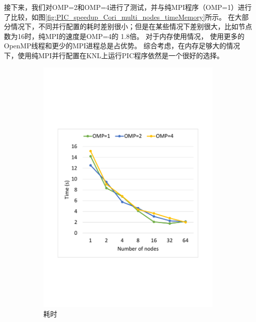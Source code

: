 接下来，我们对OMP=2和OMP=4进行了测试，并与纯MPI程序（OMP=1）进行了比较，如图\ref{fig:PIC_speedup_Cori_multi_nodes_timeMemory}所示。
在大部分情况下，不同并行配置的耗时差别很小；但是在某些情况下差别很大，比如节点数为16时，纯MPI的速度是OMP=4的 1.8倍。
对于内存使用情况， 使用更多的OpenMP线程和更少的MPI进程总是占优势。
综合考虑，在内存足够大的情况下，使用纯MPI并行配置在KNL上运行PIC程序依然是一个很好的选择。

\begin{figure}[!htb]
    \centering
    \begin{subfigure}[b]{0.48\textwidth}
        \includegraphics[width=\textwidth]{Img/PIC_speedup_Cori_multi_nodes_time.pdf}
        \caption{耗时}
    \end{subfigure}
    \begin{subfigure}[b]{0.48\textwidth}

\end{subfigure}
\end{figure}
